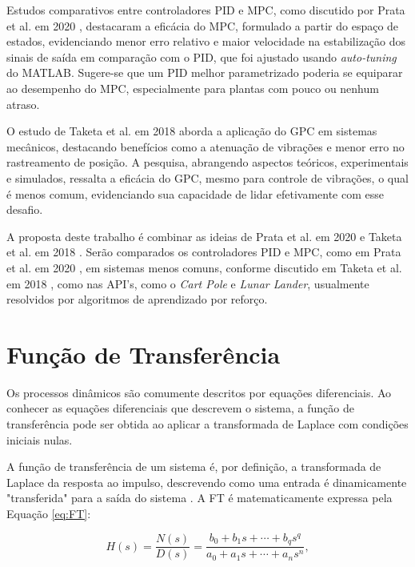 \documentclass[12pt,           %
a4paper,                       %
openany,                       %
oneside,                       %
chapter=TITLE,                 %
english,                       %
spanish,                       %
brazil,                        %
sumario=tradicional]{abntex2}  %
\begin{document}
\begin{OnehalfSpace}
Estudos comparativos entre controladores PID e MPC, como discutido por Prata et al. em 2020 \cite{prata2020}, destacaram a eficácia do MPC, formulado a partir do espaço de estados, evidenciando menor erro relativo e maior velocidade na estabilização dos sinais de saída em comparação com o PID, que foi ajustado usando \textit{auto-tuning} do MATLAB\textregistered{}. Sugere-se que um PID melhor parametrizado poderia se equiparar ao desempenho do MPC, especialmente para plantas com pouco ou nenhum atraso.

O estudo de Taketa et al. em 2018 \cite{taketa2018} aborda a aplicação do GPC em sistemas mecânicos, destacando benefícios como a atenuação de vibrações e menor erro no rastreamento de posição. A pesquisa, abrangendo aspectos teóricos, experimentais e simulados, ressalta a eficácia do GPC, mesmo para controle de vibrações, o qual é menos comum, evidenciando sua capacidade de lidar efetivamente com esse desafio.

A proposta deste trabalho é combinar as ideias de Prata et al. em 2020 \cite{prata2020} e Taketa et al. em 2018 \cite{taketa2018}. Serão comparados os controladores PID e MPC, como em Prata et al. em 2020 \cite{prata2020}, em sistemas menos comuns, conforme discutido em Taketa et al. em 2018 \cite{taketa2018}, como nas API's, como o \textit{Cart Pole} e \textit{Lunar Lander}, usualmente resolvidos por algoritmos de aprendizado por reforço.\\

\section{Função de Transferência}
\label{sec:FuncaodeTransferencia}

Os processos dinâmicos são comumente descritos por equações diferenciais. Ao conhecer as equações diferenciais que descrevem o sistema, a função de transferência pode ser obtida ao aplicar a transformada de Laplace com condições iniciais nulas.

A função de transferência de um sistema é, por definição, a transformada de Laplace da resposta ao impulso, descrevendo como uma entrada é dinamicamente "transferida" para a saída do sistema \cite{aguirre2004}. A FT é matematicamente expressa pela Equação \ref{eq:FT}:

\begin{equation} 
    \label{eq:FT}   %
	H(s) = \frac{N(s)}{D(s)} = \frac{b_0+b_{1}s+\cdots+b_{q}s^{q}}{a_0+a_{1}s+\cdots+a_{n}s^{n}},
\end{equation}


\end{OnehalfSpace}
\end{document}
